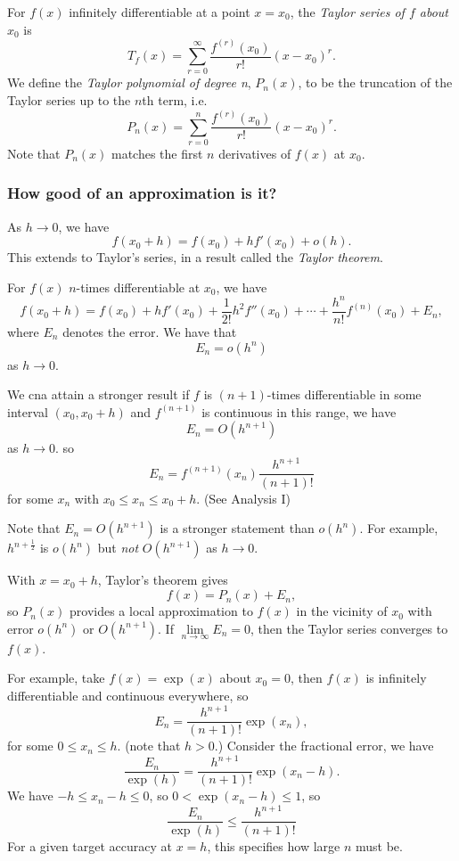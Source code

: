 \documentclass[12pt]{article}
\begin{document}
For $f(x)$ infinitely differentiable at a point $x = x_{0}$,
the \emph{Taylor series of $f$ about $x_{0}$} is 
\[
T_{f}(x) = \sum\limits_{r=0}^{\infty} \frac{f^{(r)}(x_{0})}{r!}(x - x_{0})^{r}.
\]
We define the \emph{Taylor polynomial of degree n}, $P_{n}(x)$, to be
the truncation of the Taylor series up to the $n$th term, i.e.
\[
P_{n}(x) = \sum\limits_{r=0}^{n} \frac{f^{(r)}(x_{0})}{r!}(x - x_{0})^{r}.
\]
Note that $P_n(x)$ matches the first $n$ derivatives of $f(x)$
at $x_{0}$.

\subsubsection*{How good of an approximation is it?}

As $h \to 0$, we have
\[
    f(x_{0}+h) = f(x_{0}) + hf'(x_{0}) + o(h).
\]
This extends to Taylor's series, in a result called the \emph{Taylor theorem}.

\begin{theorem}
    For $f(x)$ $n$-times differentiable at $x_{0}$, we have
    \[
    f(x_{0}+h) = f(x_{0}) + hf'(x_{0}) + \frac{1}{2!}h^{2}f''(x_{0})
    + \cdots + \frac{h^{n}}{n!}f^{(n)}(x_{0}) + E_n,
    \]
    where $E_n$ denotes the error. We have that
    \[
    E_n = o(h^{n})
    \]
    as $h \to 0$.
\end{theorem}

We cna attain a stronger result if $f$ is $(n+1)$-times differentiable
in some interval $(x_{0},x_{0}+h)$ and $f^{(n+1)}$ is continuous in this range, we have
\[
E_n = O(h^{n+1})
\]
as $h \to 0$. so
\[
E_n = f^{(n+1)}(x_{n}) \frac{h^{n+1}}{(n+1)!}
\]
for some $x_{n}$ with $x_{0} \le x_n \le x_{0} + h$. (See Analysis I)

Note that $E_n = O(h^{n+1})$ is a stronger statement than $o(h^{n})$.
For example, $h^{n+\frac{1}{2}}$ is $o(h^{n})$ but \emph{not} $O(h^{n+1})$ as $h \to 0$.

With $x = x_{0} + h$, Taylor's theorem gives
\[
f(x) = P_n(x) + E_n,
\]
so $P_n(x)$ provides a local approximation to $f(x)$ 
in the vicinity of $x_{0}$ with error $o(h^{n})$ or $O(h^{n+1})$.
If $\lim\limits_{n\to\infty}E_{n} = 0$, then the
Taylor series converges to $f(x)$.

For example, take $f(x) = \exp(x)$ about $x_{0} = 0$,
then $f(x)$ is infinitely differentiable and continuous everywhere, so
\[
E_n = \frac{h^{n+1}}{(n+1)!}\exp(x_n),
\]
for some $0 \le x_n \le h$. (note that $h > 0$.)
Consider the fractional error, we have
\[
    \dfrac{E_n}{\exp(h)}= \frac{h^{n+1}}{(n+1)!}\exp(x_n - h).
\]
We have $-h \le x_n - h \le 0$, so $0 < \exp(x_n - h) \le 1$, so
\[
\frac{E_n}{\exp(h)} \le \frac{h^{n+1}}{(n+1)!}
\]
For a given target accuracy at $x=h$, 
this specifies how large $n$ must be.
\end{document}
